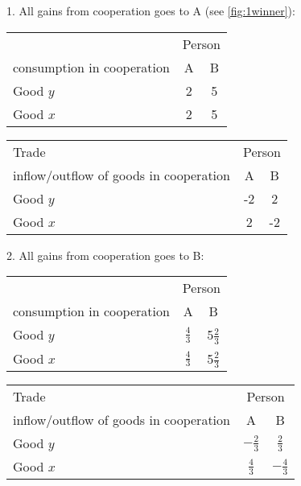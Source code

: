 {1. All gains from cooperation goes to A (see \autoref{fig:1winner}):

\begin{minipage}[t]{0.4\textwidth}
	\begin{center}
		\begin{tabular}{lcc}\toprule
			&\multicolumn{2}{c}{Person} \\\cmidrule{2-3}
			consumption in cooperation	&A &B \\		\midrule
			Good $y$ & 2 & 5\\
			Good $x$ & 2 & 5 \\\bottomrule
		\end{tabular}
	\end{center}
\end{minipage}
\begin{minipage}[t]{0.59\textwidth}
	\begin{center}
		\begin{tabular}{lcc}\toprule
			Trade	&\multicolumn{2}{c}{Person} \\\cmidrule{2-3}
			inflow/outflow of goods in cooperation	&A &B \\		\midrule
			Good $y$ & -2 & 2\\
			Good $x$ & 2 & -2 \\\bottomrule
		\end{tabular}
	\end{center}
\end{minipage}

2. All gains from cooperation goes to B:

\begin{minipage}[t]{0.4\textwidth}
	\begin{center}
		\begin{tabular}{lcc}\toprule
			&\multicolumn{2}{c}{Person} \\\cmidrule{2-3}
			consumption in cooperation	&A &B \\		\midrule
			Good $y$ & $\frac{4}{3}$ & 5$\frac{2}{3}$\\
			Good $x$ & $\frac{4}{3}$ & 5$\frac{2}{3}$ \\\bottomrule
		\end{tabular}
	\end{center}
\end{minipage}
\begin{minipage}[t]{0.59\textwidth}
	\begin{center}
		\begin{tabular}{lcc}\toprule
			Trade	&\multicolumn{2}{c}{Person} \\\cmidrule{2-3}
			inflow/outflow of goods in cooperation	&A &B \\		\midrule
			Good $y$ & $-\frac{2}{3}$ & $\frac{2}{3}$\\
			Good $x$ & $\frac{4}{3}$ & $-\frac{4}{3}$ \\\bottomrule
		\end{tabular}
	\end{center}
\end{minipage}

}
